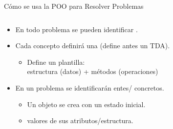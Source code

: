 \documentclass[10pt,envcountsect,spanish]{beamer}
\begin{document}
\begin{frame}{Cómo se usa la POO para Resolver Problemas}



\begin{columns}
\begin{column}{.6\textwidth}
\begin{itemize}
\item En todo problema se pueden identificar .
\item Cada concepto definirá una  (define antes un TDA).

\begin{itemize}
\item Define un plantilla: \\ estructura (datos) + métodos (operaciones)
\end{itemize}


\item En un problema se identificarán entes/ concretos.

\begin{itemize}
\item Un objeto se crea con un estado inicial.
\item {} valores de sus atributos/estructura.
\end{itemize}

\end{itemize}
\end{column}

\begin{column}{.3\textwidth}



\begin{tikzpicture}[x=0.75pt,y=0.75pt,yscale=-1,xscale=1, scale = 0.45]


\end{tikzpicture}
\end{column}
\end{columns}
\end{frame}
\end{document}
